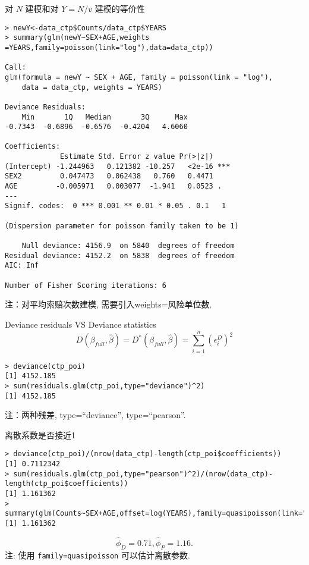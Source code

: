 \documentclass[professionalfont]{beamer}
\begin{document}
\begin{frame}[fragile]{对 $N$ 建模和对 $Y=N/v$ 建模的等价性}
\begin{lstlisting}
> newY<-data_ctp$Counts/data_ctp$YEARS
> summary(glm(newY~SEX+AGE,weights =YEARS,family=poisson(link="log"),data=data_ctp))

Call:
glm(formula = newY ~ SEX + AGE, family = poisson(link = "log"), 
    data = data_ctp, weights = YEARS)

Deviance Residuals: 
    Min       1Q   Median       3Q      Max  
-0.7343  -0.6896  -0.6576  -0.4204   4.6060  

Coefficients:
             Estimate Std. Error z value Pr(>|z|)    
(Intercept) -1.244963   0.121382 -10.257   <2e-16 ***
SEX2         0.047473   0.062438   0.760   0.4471    
AGE         -0.005971   0.003077  -1.941   0.0523 .  
---
Signif. codes:  0 *** 0.001 ** 0.01 * 0.05 . 0.1   1 

(Dispersion parameter for poisson family taken to be 1)

    Null deviance: 4156.9  on 5840  degrees of freedom
Residual deviance: 4152.2  on 5838  degrees of freedom
AIC: Inf

Number of Fisher Scoring iterations: 6
\end{lstlisting}	
注：对平均索赔次数建模, 需要引入weights=风险单位数.
\end{frame}
\begin{frame}[fragile]{Deviance residuals VS Deviance statistics }
	\begin{equation}
	D(\beta_{full},\hat{\beta})=D^*(\beta_{full},\hat{\beta})=\sum_{i=1}^n\left(\epsilon^D_i\right)^2
	\end{equation}
	\begin{lstlisting}
> deviance(ctp_poi)
[1] 4152.185
> sum(residuals.glm(ctp_poi,type="deviance")^2)
[1] 4152.185
\end{lstlisting}
注：两种残差, type=``deviance'', type=``pearson''.
\end{frame}
\begin{frame}[fragile]{离散系数是否接近1}
\begin{lstlisting}
> deviance(ctp_poi)/(nrow(data_ctp)-length(ctp_poi$coefficients))
[1] 0.7112342
> sum(residuals.glm(ctp_poi,type="pearson")^2)/(nrow(data_ctp)-length(ctp_poi$coefficients))
[1] 1.161362
> summary(glm(Counts~SEX+AGE,offset=log(YEARS),family=quasipoisson(link="log"),data=data_ctp))$dispersion
[1] 1.161362
\end{lstlisting}
$$\hat{\phi}_D=0.71, \hat{\phi}_P=1.16.$$
注: 使用 \texttt{family=quasipoisson} 可以估计离散参数.	
\end{frame}
\end{document}
